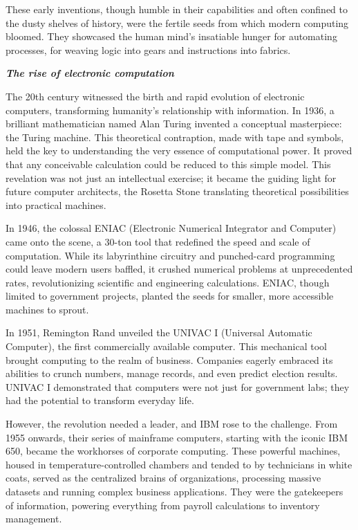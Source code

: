 \documentclass[
  letterpaper,
  DIV=11,
  numbers=noendperiod]{scrreprt}
\begin{document}
These early inventions, though humble in their capabilities and often
confined to the dusty shelves of history, were the fertile seeds from
which modern computing bloomed. They showcased the human mind's
insatiable hunger for automating processes, for weaving logic into gears
and instructions into fabrics.

\textbf{\emph{The rise of electronic computation}}

The 20th century witnessed the birth and rapid evolution of electronic
computers, transforming humanity's relationship with information. In
1936, a brilliant mathematician named Alan Turing invented a conceptual
masterpiece: the Turing machine. This theoretical contraption, made with
tape and symbols, held the key to understanding the very essence of
computational power. It proved that any conceivable calculation could be
reduced to this simple model. This revelation was not just an
intellectual exercise; it became the guiding light for future computer
architects, the Rosetta Stone translating theoretical possibilities into
practical machines.

In 1946, the colossal ENIAC (Electronic Numerical Integrator and
Computer) came onto the scene, a 30-ton tool that redefined the speed
and scale of computation. While its labyrinthine circuitry and
punched-card programming could leave modern users baffled, it crushed
numerical problems at unprecedented rates, revolutionizing scientific
and engineering calculations. ENIAC, though limited to government
projects, planted the seeds for smaller, more accessible machines to
sprout.

In 1951, Remington Rand unveiled the UNIVAC I (Universal Automatic
Computer), the first commercially available computer. This mechanical
tool brought computing to the realm of business. Companies eagerly
embraced its abilities to crunch numbers, manage records, and even
predict election results. UNIVAC I demonstrated that computers were not
just for government labs; they had the potential to transform everyday
life.

However, the revolution needed a leader, and IBM rose to the challenge.
From 1955 onwards, their series of mainframe computers, starting with
the iconic IBM 650, became the workhorses of corporate computing. These
powerful machines, housed in temperature-controlled chambers and tended
to by technicians in white coats, served as the centralized brains of
organizations, processing massive datasets and running complex business
applications. They were the gatekeepers of information, powering
everything from payroll calculations to inventory management.
\end{document}
